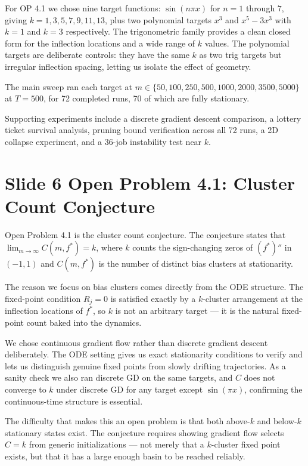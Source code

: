 \documentclass[11pt]{article}
\begin{document}
For OP 4.1 we chose nine target functions: $\sin(n\pi x)$ for $n = 1$ through $7$, giving $k = 1, 3, 5, 7, 9, 11, 13$, plus two polynomial targets $x^3$ and $x^5 - 3x^3$ with $k = 1$ and $k = 3$ respectively.
The trigonometric family provides a clean closed form for the inflection locations and a wide range of $k$ values.
The polynomial targets are deliberate controls: they have the same $k$ as two trig targets but irregular inflection spacing, letting us isolate the effect of geometry.

The main sweep ran each target at $m \in \{50, 100, 250, 500, 1000, 2000, 3500, 5000\}$ at $T = 500$, for 72 completed runs, 70 of which are fully stationary.

Supporting experiments include a discrete gradient descent comparison, a lottery ticket survival analysis, pruning bound verification across all 72 runs, a 2D collapse experiment, and a 36-job instability test near $k$.

\section*{Slide 6 \quad Open Problem 4.1: Cluster Count Conjecture}

Open Problem 4.1 is the cluster count conjecture.
The conjecture states that $\lim_{m\to\infty} C(m, f^*) = k$, where $k$ counts the sign-changing zeros of $(f^*)''$ in $(-1,1)$ and $C(m, f^*)$ is the number of distinct bias clusters at stationarity.

The reason we focus on bias clusters comes directly from the ODE structure.
The fixed-point condition $R_j = 0$ is satisfied exactly by a $k$-cluster arrangement at the inflection locations of $f^*$, so $k$ is not an arbitrary target --- it is the natural fixed-point count baked into the dynamics.

We chose continuous gradient flow rather than discrete gradient descent deliberately.
The ODE setting gives us exact stationarity conditions to verify and lets us distinguish genuine fixed points from slowly drifting trajectories.
As a sanity check we also ran discrete GD on the same targets, and $C$ does not converge to $k$ under discrete GD for any target except $\sin(\pi x)$, confirming the continuous-time structure is essential.

The difficulty that makes this an open problem is that both above-$k$ and below-$k$ stationary states exist.
The conjecture requires showing gradient flow selects $C = k$ from generic initializations --- not merely that a $k$-cluster fixed point exists, but that it has a large enough basin to be reached reliably.
\end{document}
